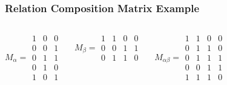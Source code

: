 \documentclass[dvipsnames]{beamer}
\begin{document}
\begin{frame}
  \frametitle{Relation Composition Matrix Example}

  \begin{example}
    \begin{columns}
      \[
        M_\alpha =
          \begin{array}{|ccc|}
            1 & 0 & 0\\
            0 & 0 & 1\\
            0 & 1 & 1\\
            0 & 1 & 0\\
            1 & 0 & 1
         \end{array}
      \]

      \[
        M_\beta =
          \begin{array}{|cccc|}
            1 & 1 & 0 & 0\\
            0 & 0 & 1 & 1\\
            0 & 1 & 1 & 0
          \end{array}
      \]

      \[
        M_{\alpha \beta} =
          \begin{array}{|cccc|}
            1 & 1 & 0 & 0\\
            0 & 1 & 1 & 0\\
            0 & 1 & 1 & 1\\
            0 & 0 & 1 & 1\\
            1 & 1 & 1 & 0
          \end{array}
      \]
    \end{columns}
  \end{example}
\end{frame}
\end{document}
